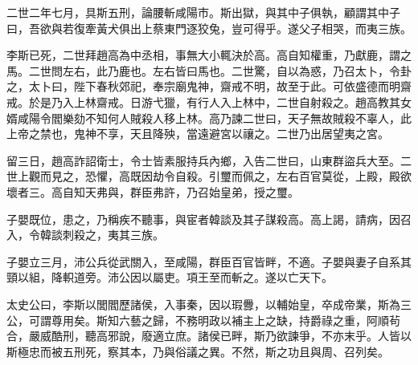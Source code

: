 二世二年七月，具斯五刑，論腰斬咸陽市。斯出獄，與其中子俱執，顧謂其中子曰，吾欲與若復牽黃犬俱出上蔡東門逐狡兔，豈可得乎。遂父子相哭，而夷三族。

李斯已死，二世拜趙高為中丞相，事無大小輒決於高。高自知權重，乃獻鹿，謂之馬。二世問左右，此乃鹿也。左右皆曰馬也。二世驚，自以為惑，乃召太卜，令卦之，太卜曰，陛下春秋郊祀，奉宗廟鬼神，齋戒不明，故至于此。可依盛德而明齋戒。於是乃入上林齋戒。日游弋獵，有行人入上林中，二世自射殺之。趙高教其女婿咸陽令閻樂劾不知何人賊殺人移上林。高乃諫二世曰，天子無故賊殺不辜人，此上帝之禁也，鬼神不享，天且降殃，當遠避宮以禳之。二世乃出居望夷之宮。

留三日，趙高詐詔衛士，令士皆素服持兵內鄉，入告二世曰，山東群盜兵大至。二世上觀而見之，恐懼，高既因劫令自殺。引璽而佩之，左右百官莫從，上殿，殿欲壞者三。高自知天弗與，群臣弗許，乃召始皇弟，授之璽。

子嬰既位，患之，乃稱疾不聽事，與宦者韓談及其子謀殺高。高上謁，請病，因召入，令韓談刺殺之，夷其三族。

子嬰立三月，沛公兵從武關入，至咸陽，群臣百官皆畔，不適。子嬰與妻子自系其頸以組，降軹道旁。沛公因以屬吏。項王至而斬之。遂以亡天下。

太史公曰，李斯以閭閻歷諸侯，入事秦，因以瑕釁，以輔始皇，卒成帝業，斯為三公，可謂尊用矣。斯知六藝之歸，不務明政以補主上之缺，持爵祿之重，阿順茍合，嚴威酷刑，聽高邪說，廢適立庶。諸侯已畔，斯乃欲諫爭，不亦末乎。人皆以斯極忠而被五刑死，察其本，乃與俗議之異。不然，斯之功且與周、召列矣。
